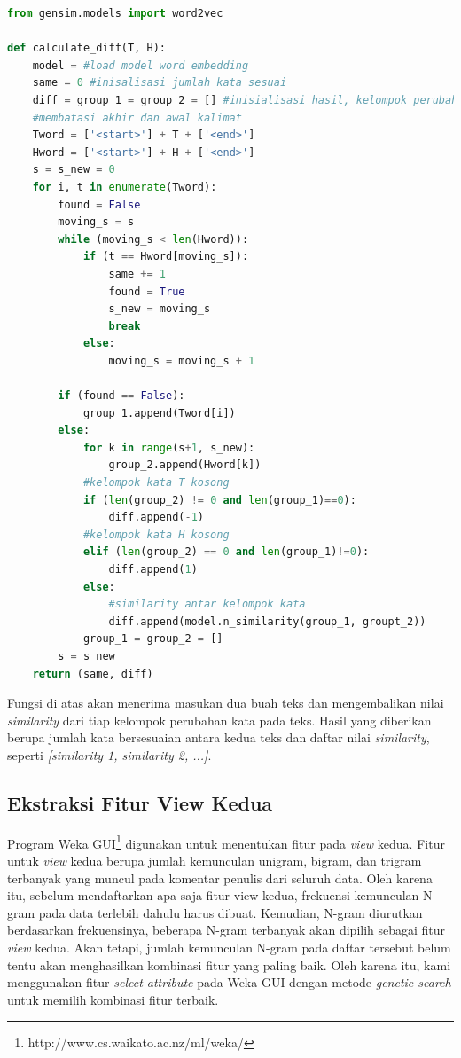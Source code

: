 \begin{lstlisting}[language=Python, caption={Perhitungan \textit{similarity} kelompok kata}, label={kode-fitur-tambahan-2}]
from gensim.models import word2vec

def calculate_diff(T, H):
	model = #load model word embedding
	same = 0 #inisalisasi jumlah kata sesuai
	diff = group_1 = group_2 = [] #inisialisasi hasil, kelompok perubahan kata di T, dan kelompok perubahan kata di H
	#membatasi akhir dan awal kalimat
	Tword = ['<start>'] + T + ['<end>']
	Hword = ['<start>'] + H + ['<end>']	
	s = s_new = 0
	for i, t in enumerate(Tword):
		found = False
		moving_s = s
		while (moving_s < len(Hword)): 
			if (t == Hword[moving_s]):
				same += 1
				found = True
				s_new = moving_s		  
				break
			else:
				moving_s = moving_s + 1					
			
		if (found == False):
			group_1.append(Tword[i])
		else:
			for k in range(s+1, s_new):
				group_2.append(Hword[k])		
			#kelompok kata T kosong
			if (len(group_2) != 0 and len(group_1)==0):
				diff.append(-1)
			#kelompok kata H kosong
			elif (len(group_2) == 0 and len(group_1)!=0):
				diff.append(1)
			else:
				#similarity antar kelompok kata
				diff.append(model.n_similarity(group_1, groupt_2))
			group_1 = group_2 = []
		s = s_new	  
	return (same, diff)	
\end{lstlisting}
\noindent Fungsi di atas akan menerima masukan dua buah teks dan mengembalikan nilai \textit{similarity} dari tiap kelompok perubahan kata pada teks. Hasil yang diberikan berupa jumlah kata bersesuaian antara kedua teks dan daftar nilai \textit{similarity}, seperti \textit{[similarity 1, similarity 2, ...]}. 

\subsection{Ekstraksi Fitur View Kedua}
Program Weka GUI\footnote{http://www.cs.waikato.ac.nz/ml/weka/} digunakan untuk menentukan fitur pada \textit{view} kedua. Fitur untuk \textit{view} kedua berupa jumlah kemunculan unigram, bigram, dan trigram terbanyak yang muncul pada komentar penulis dari seluruh data. Oleh karena itu, sebelum mendaftarkan apa saja fitur view kedua, frekuensi kemunculan N-gram pada data terlebih dahulu harus dibuat. Kemudian, N-gram diurutkan berdasarkan frekuensinya, beberapa N-gram terbanyak akan dipilih sebagai fitur \textit{view} kedua. Akan tetapi, jumlah kemunculan N-gram pada daftar tersebut belum tentu akan menghasilkan kombinasi fitur yang paling baik. Oleh karena itu, kami menggunakan fitur \textit{select attribute} pada Weka GUI dengan metode \textit{genetic search} untuk memilih kombinasi fitur terbaik.


